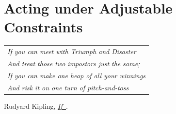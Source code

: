 
\graphicspath{{2-Chapters/5-Chapter/}}

\chapter{Acting under Adjustable Constraints}
\label{chapter:5}

\begin{flushright}
	\begin{tabular}{@{}l@{}}
		\emph{If you can meet with Triumph and Disaster}\\
		\emph{And treat those two impostors just the same;}\\
		\hdashline
		\emph{If you can make one heap of all your winnings}\\
		\emph{And risk it on one turn of pitch-and-toss}\\
	\end{tabular}

	Rudyard Kipling, \href{https://eleurent.github.io/sisyphe/texts/if-.html}{\emph{If--}}.
\end{flushright}

%


